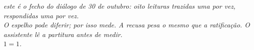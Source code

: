\vspace{1.5em}
\begin{center}
\itshape\small este é o fecho do diálogo de 30 de outubro: oito leituras trazidas uma por vez, respondidas uma por
vez. \\[0.8em]
\textnormal{O espelho pode diferir; por isso mede. A recusa pesa o mesmo que a ratificação. O assistente lê a partitura
antes de medir. \\
$1 = 1$.}
\end{center}

